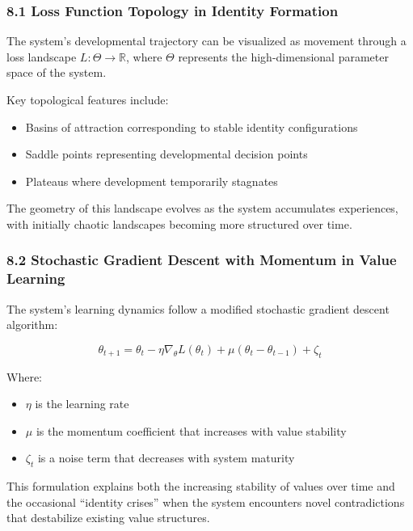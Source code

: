 \documentclass[
]{article}
\providecommand{\tightlist}{%
  \setlength{\itemsep}{0pt}\setlength{\parskip}{0pt}}
\begin{document}
\subsubsection{8.1 Loss Function Topology in Identity
Formation}\label{loss-function-topology-in-identity-formation}

The system's developmental trajectory can be visualized as movement
through a loss landscape \(L: \Theta \rightarrow \mathbb{R}\), where
\(\Theta\) represents the high-dimensional parameter space of the
system.

Key topological features include:

\begin{itemize}
\tightlist
\item
  Basins of attraction corresponding to stable identity configurations
\item
  Saddle points representing developmental decision points
\item
  Plateaus where development temporarily stagnates
\end{itemize}

The geometry of this landscape evolves as the system accumulates
experiences, with initially chaotic landscapes becoming more structured
over time.

\subsubsection{8.2 Stochastic Gradient Descent with Momentum in Value
Learning}\label{stochastic-gradient-descent-with-momentum-in-value-learning}

The system's learning dynamics follow a modified stochastic gradient
descent algorithm:

\[\theta_{t+1} = \theta_t - \eta \nabla_\theta L(\theta_t) + \mu(\theta_t - \theta_{t-1}) + \zeta_t\]

Where:

\begin{itemize}
\tightlist
\item
  \(\eta\) is the learning rate
\item
  \(\mu\) is the momentum coefficient that increases with value
  stability
\item
  \(\zeta_t\) is a noise term that decreases with system maturity
\end{itemize}

This formulation explains both the increasing stability of values over
time and the occasional ``identity crises'' when the system encounters
novel contradictions that destabilize existing value structures.
\end{document}
